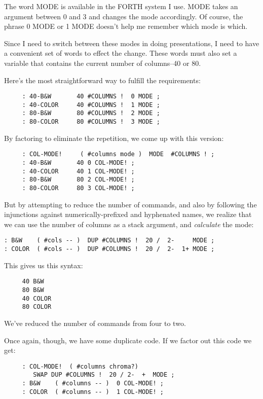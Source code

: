 \noindent
The word MODE is available in the FORTH system I use. MODE takes an argument between 0 and 3 and changes the mode accordingly. Of course, the phrase 0 MODE or 1 MODE doesn't help me remember which mode is which.

Since I need to switch between these modes in doing presentations, I need to have a convenient set of words to effect the change. These words must also set a variable that contains the current number of columns--40 or 80.

Here's the most straightforward way to fulfill the requirements:

\begin{verbatim}
     : 40-B&W       40 #COLUMNS !  0 MODE ;
     : 40-COLOR     40 #COLUMNS !  1 MODE ;
     : 80-B&W       80 #COLUMNS !  2 MODE ;
     : 80-COLOR     80 #COLUMNS !  3 MODE ;
\end{verbatim}
By factoring to eliminate the repetition, we come up with this version:

\begin{verbatim}
     : COL-MODE!     ( #columns mode )  MODE  #COLUMNS ! ;
     : 40-B&W       40 0 COL-MODE! ;
     : 40-COLOR     40 1 COL-MODE! ;
     : 80-B&W       80 2 COL-MODE! ;
     : 80-COLOR     80 3 COL-MODE! ;
\end{verbatim}
But by attempting to reduce the number of commands, and also by following the injunctions against numerically-prefixed and hyphenated names, we realize that we can use the number of columns as a stack argument, and \emph{calculate} the mode:

\begin{verbatim}
: B&W    ( #cols -- )  DUP #COLUMNS !  20 /  2-     MODE ;
: COLOR  ( #cols -- )  DUP #COLUMNS !  20 /  2-  1+ MODE ;
\end{verbatim}
This gives us this syntax:

\begin{verbatim}
     40 B&W
     80 B&W
     40 COLOR
     80 COLOR
\end{verbatim}
We've reduced the number of commands from four to two.

Once again, though, we have some duplicate code. If we factor out this code we get:

\begin{verbatim}
     : COL-MODE!  ( #columns chroma?)
        SWAP DUP #COLUMNS !  20 / 2-  +  MODE ;
     : B&W    ( #columns -- )  0 COL-MODE! ;
     : COLOR  ( #columns -- )  1 COL-MODE! ;
\end{verbatim}
     
